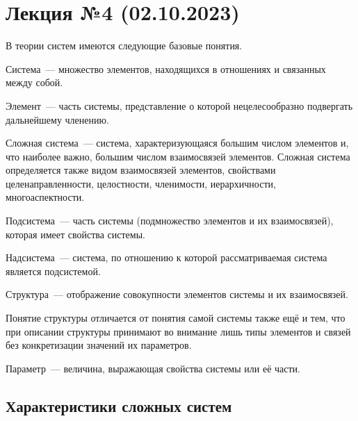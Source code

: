 \section{Лекция №4 (02.10.2023)}

В теории систем имеются следующие базовые понятия.

\begin{dd}
    Система~--- множество элементов, находящихся в отношениях и связанных между собой.
\end{dd}

\begin{dd}
    Элемент~--- часть системы, представление о которой нецелесообразно подвергать дальнейшему членению.
\end{dd}

\begin{dd}
    Сложная система~--- система, характеризующаяся большим числом элементов и, что наиболее важно, большим числом взаимосвязей элементов. Сложная система определяется также видом взаимосвязей элементов, свойствами целенаправленности, целостности, членимости, иерархичности, многоаспектности.
\end{dd}

\begin{dd}
    Подсистема~--- часть системы (подмножество элементов и их взаимосвязей), которая имеет свойства системы.
\end{dd}

\begin{dd}
    Надсистема~--- система, по отношению к которой рассматриваемая система является подсистемой.
\end{dd}

\begin{dd}
    Структура~--- отображение совокупности элементов системы и их взаимосвязей.
\end{dd}

Понятие структуры отличается от понятия самой системы также ещё и тем, что при описании структуры принимают во внимание лишь типы элементов и связей без конкретизации значений их параметров.

\begin{dd}
    Параметр~--- величина, выражающая свойства системы или её части.
\end{dd}

\subsection{Характеристики сложных систем}

